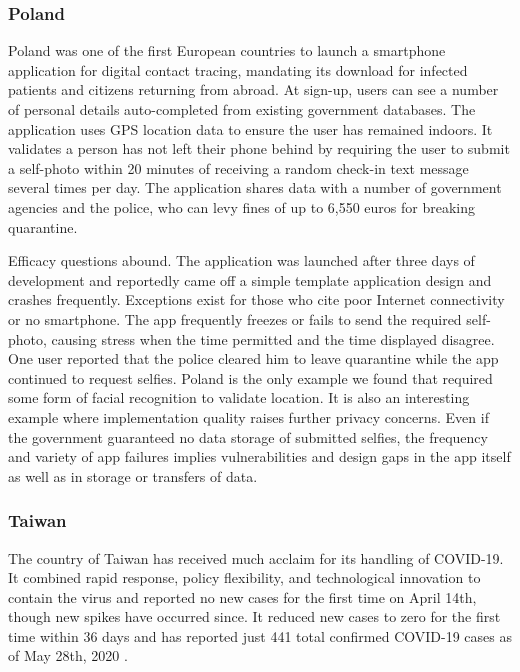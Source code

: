 \documentclass{article}
\begin{document}
\subsubsection{Poland}
Poland was one of the first European countries to launch a smartphone application for digital contact tracing, mandating its download for infected patients and citizens returning from abroad. At sign-up, users can see a number of personal details auto-completed from existing government databases. The application uses GPS location data to ensure the user has remained indoors. It validates a person has not left their phone behind by requiring the user to submit a self-photo within 20 minutes of receiving a random check-in text message several times per day. The application shares data with a number of government agencies and the police, who can levy fines of up to 6,550 euros for breaking quarantine\cite{PolandApp}. 

Efficacy questions abound. The application was launched after three days of development and reportedly came off a simple template application design and crashes frequently. Exceptions exist for those who cite poor Internet connectivity or no smartphone. The app frequently freezes or fails to send the required self-photo, causing stress when the time permitted and the time displayed disagree. One user reported that the police cleared him to leave quarantine while the app continued to request selfies. Poland is the only example we found that required some form of facial recognition to validate location. It is also an interesting example where implementation quality raises further privacy concerns. Even if the government guaranteed no data storage of submitted selfies, the frequency and variety of app failures implies vulnerabilities and design gaps in the app itself as well as in storage or transfers of data.

\subsubsection{Taiwan}
The country of Taiwan has received much acclaim for its handling of COVID-19. It combined rapid response, policy flexibility, and technological innovation to contain the virus and reported no new cases for the first time on April 14th, though new spikes have occurred since. It reduced new cases to zero for the first time within 36 days and has reported just 441 total confirmed COVID-19 cases as of May 28th, 2020 \cite{TaiwanNoCases}.
\end{document}
